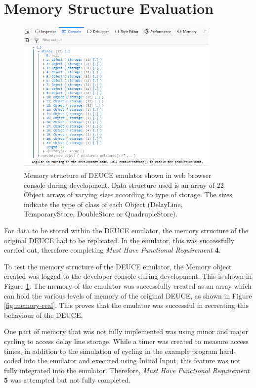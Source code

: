 \documentclass{l4proj}
\begin{document}
\section{Memory Structure Evaluation}

\begin{figure}[h!]
	\includegraphics[width=0.9\textwidth]{images/memory-emu}
	\caption{Memory structure of DEUCE emulator shown in web browser console during development. Data structure used is an array of 22 Object arrays of varying sizes according to type of storage. The sizes indicate the type of class of each Object (DelayLine, TemporaryStore, DoubleStore or QuadrupleStore).}
	\label{fig:memory-emu}
\end{figure}

For data to be stored within the DEUCE emulator, the memory structure of the original DEUCE had to be replicated. In the emulator, this was successfully carried out, therefore completing \textit{Must Have Functional Requirement} \textbf{4}.

To test the memory structure of the DEUCE emulator, the Memory object created was logged to the developer console during development. This is shown in Figure \ref{fig:memory-emu}. The memory of the emulator was successfully created as an array which can hold the various levels of memory of the original DEUCE, as shown in Figure \ref{fig:memory-real}. This proves that the emulator was successful in recreating this behaviour of the DEUCE.

One part of memory that was not fully implemented was using minor and major cycling to access delay line storage. While a timer was created to measure access times, in addition to the simulation of cycling in the example program hard-coded into the emulator and executed using Initial Input, this feature was not fully integrated into the emulator. Therefore, \textit{Must Have Functional Requirement} \textbf{5} was attempted but not fully completed.
\end{document}
